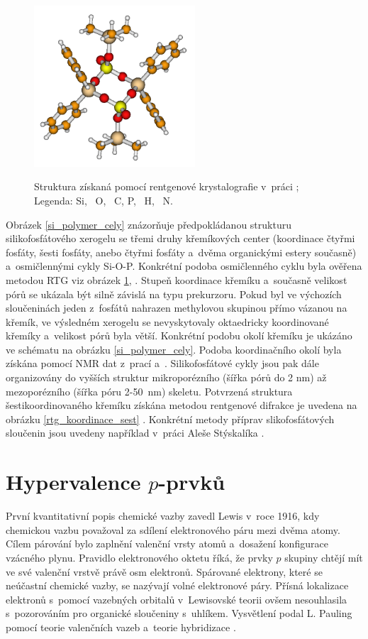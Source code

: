 \documentclass[
digital, %
table,   %
nolof,     %
nolot,     %
oneside,
]{fithesis3}
\begin{document}
\begin{figure}
\caption{Struktura \ce{[(Ph2Si{O2P(O)OSiMe3})2]} získaná pomocí rentgenové krystalografie v~práci \cite{rtg_4_pinkas}; Legenda:  Si, ~O, ~C,  P, ~H, ~N.}
\center \includegraphics[width=6cm]{rtg_kruh_samostatne.png} \label{rtg_cyklus} \end{figure}
Obrázek \ref{si_polymer_cely} znázorňuje předpokládanou strukturu silikofosfátového xerogelu se třemi druhy křemíkových center (koordinace čtyřmi fosfáty, šesti fosfáty, anebo čtyřmi fosfáty a~dvěma organickými estery současně) a~osmičlennými cykly Si-O-P.  Konkrétní podoba osmičlenného cyklu byla ověřena metodou RTG viz obrázek \ref{rtg_cyklus}, \cite{rtg_4_pinkas}. Stupeň koordinace křemíku a~současně velikost pórů se ukázala být silně závislá na typu prekurzoru. Pokud byl ve výchozích sloučeninách jeden z~fosfátů nahrazen methylovou skupinou přímo vázanou na křemík, ve výsledném xerogelu se nevyskytovaly oktaedricky koordinované křemíky a~velikost pórů byla větší. Konkrétní podobu okolí křemíku je ukázáno ve schématu na obrázku \ref{si_polymer_cely}. Podoba koordinačního okolí byla získána pomocí NMR dat z~prací \cite{rtg_4_pinkas} a~\cite{Styskalik2015thesis}. Silikofosfátové cykly jsou pak dále organizovány do vyšších struktur mikroporézního (šířka pórů do 2 nm) až mezoporézního (šířka póru 2-50~nm) skeletu. Potvrzená struktura šestikoordinovaného křemíku získána metodou rentgenové difrakce je uvedena na obrázku \ref{rtg_koordinace_sest} \cite{C3NJ00721A}. Konkrétní metody příprav slikofosfátových sloučenin jsou uvedeny například v~práci Aleše Stýskalíka \cite{Styskalik2015thesis}.


\section{Hypervalence $p$-prvků}
První kvantitativní popis chemické vazby zavedl Lewis v~roce 1916, kdy chemickou vazbu považoval za sdílení elektronového páru mezi dvěma atomy. Cílem párování bylo zaplnění valenční vrsty atomů a~dosažení konfigurace vzácného plynu. Pravidlo elektronového oktetu říká, že  prvky $p$ skupiny chtějí mít ve své valenční vrstvě právě osm elektronů. Spárované elektrony, které se neúčastní chemické vazby, se nazývají volné elektronové páry. Přísná lokalizace elektronů s~pomocí vazebných orbitalů v~Lewisovské teorii ovšem nesouhlasila s~pozorováním pro organické sloučeniny s~uhlíkem. Vysvětlení podal L. Pauling pomocí teorie valenčních vazeb a~teorie hybridizace \cite{Munzarova1996thesis}.\\
\end{document}
